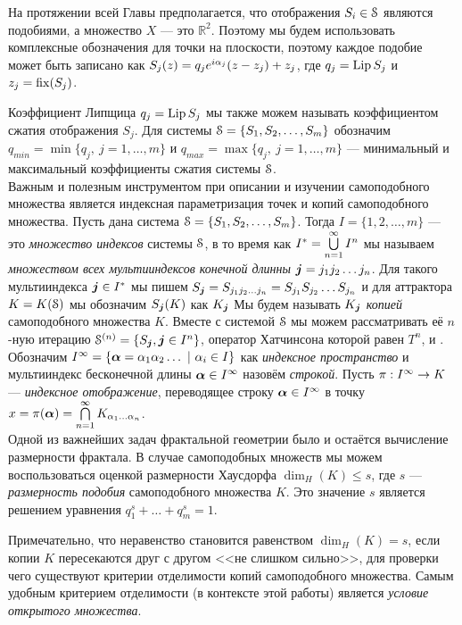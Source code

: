 На протяжении всей Главы предполагается, что отображения $S_i\in {\EuScript S}$ являются подобиями, а множество $X$ --- это $\mathbb{R}^2$.
Поэтому мы будем использовать комплексные обозначения для точки на плоскости, поэтому каждое подобие может быть записано как $S_j(z)=q_j e^{i\alpha_j}(z-z_j)+z_j$, где $q_j=\mathop{\rm Lip} \nolimits S_j$ и $z_j=\mathop{\rm fix} \nolimits(S_j)$.

Коэффициент Липщица $q_j=\mathop{\rm Lip} \nolimits S_j$ мы также можем называть коэффициентом сжатия отображения $S_j$.
Для системы ${\EuScript S}=\{S_1, S_2, \ldots, S_m\}$ обозначим $q_{min}=\min\{q_j,\ j=1,\ldots,m\}$ и $q_{max}=\max\{q_j,\ j=1,\ldots,m\}$ --- минимальный и максимальный коэффициенты сжатия системы ${\EuScript S}$.\\

Важным и полезным инструментом при описании и изучении самоподобного множества является индексная параметризация точек и копий самоподобного множества.
Пусть дана система ${\EuScript S}=\{S_1, S_2, \ldots, S_m\}$.
Тогда $I=\{1,2,\ldots,m\}$ --- это {\em множество индексов} системы ${\EuScript S}$, в то время как $I^*=\bigcup\limits_{n=1}^\infty I^n$ мы называем {\em множеством всех мультииндексов конечной длинны} ${\bm{j}}=j_1 j_2 \ldots j_n$.
Для такого мультииндекса ${\bm{j}}\in I^*$ мы пишем $S_{\bm{j}}=S_{j_1j_2\ldots j_n}=S_{j_1}S_{j_2}\ldots S_{j_n}$ и для аттрактора $K=K({\EuScript S})$ мы обозначим $S_{\bm{j}}(K)$ как $K_{\bm{j}}$
Мы будем называть $K_{\bm{j}}$ {\em копией} самоподобного множества $K$.
Вместе с системой ${\EuScript S}$ мы можем рассматривать её $n$-ную итерацию ${\EuScript S}^{(n)}=\{S_{\bm{j}}, {\bm{j}}\in I^n\}$, оператор Хатчинсона которой равен $T^n$, и .\\
 
Обозначим $I^{\8}=\{{\bma}=\al_1\al_2\ldots\ |\ \al_i\in I\}$ как {\em индексное пространство} и мультииндекс бесконечной длины ${\bm{\alpha}}\in I^{\infty}$ назовём {\em строкой}.
Пусть $\pi:I^{\infty}\rightarrow K$ --- {\em индексное отображение}, переводящее строку ${\bm{\alpha}}\in I^{\infty}$ в точку $x=\pi({\bm{\alpha}})=\bigcap\limits_{n=1}^\infty K_{\alpha_1\ldots\alpha_n}$.\\

Одной из важнейших задач фрактальной геометрии было и остаётся вычисление размерности фрактала.
В случае самоподобных множеств мы можем воспользоваться оценкой размерности Хаусдорфа $\dim_H(K)\leq s$, где $s$ --- {\em размерность подобия} самоподобного множества $K$.
Это значение $s$ является решением уравнения $q_1^s+\ldots+q_m^s=1$.

Примечательно, что неравенство становится равенством $\dim_H(K)=s$, если копии $K$ пересекаются друг с другом <<не слишком сильно>>, для проверки чего существуют критерии отделимости копий самоподобного множества.
Самым удобным критерием отделимости (в контексте этой работы) является {\em условие открытого множества}. 

